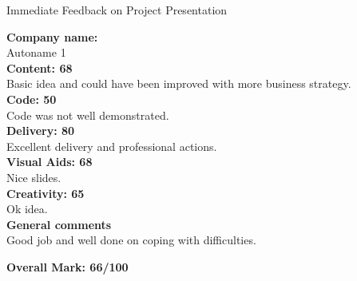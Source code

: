 \documentclass{article}
\begin{document}
\begin{center}
\Huge{Immediate Feedback on Project Presentation}\\
\end{center}


\normalsize
\textbf{Company name:}\\

Autoname 1\\

\textbf{Content: 68}\\

Basic idea and could have been improved with more business strategy.\\

\textbf{Code: 50}\\

Code was not well demonstrated.\\

\textbf{Delivery: 80}\\

Excellent delivery and professional actions.\\

\textbf{Visual Aids: 68}\\

Nice slides.\\

\textbf{Creativity: 65}\\

Ok idea.\\

\textbf{General comments}\\

Good job and well done on coping with difficulties.

\textbf{Overall Mark: 66/100}
\end{document}
